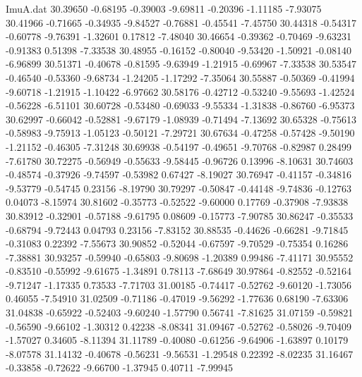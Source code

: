 \begin{filecontents}{ImuA.dat}
  30.39650   -0.68195   -0.39003   -9.69811   -0.20396   -1.11185   -7.93075
  30.41966   -0.71665   -0.34935   -9.84527   -0.76881   -0.45541   -7.45750
  30.44318   -0.54317   -0.60778   -9.76391   -1.32601    0.17812   -7.48040
  30.46654   -0.39362   -0.70469   -9.63231   -0.91383    0.51398   -7.33538
  30.48955   -0.16152   -0.80040   -9.53420   -1.50921   -0.08140   -6.96899
  30.51371   -0.40678   -0.81595   -9.63949   -1.21915   -0.69967   -7.33538
  30.53547   -0.46540   -0.53360   -9.68734   -1.24205   -1.17292   -7.35064
  30.55887   -0.50369   -0.41994   -9.60718   -1.21915   -1.10422   -6.97662
  30.58176   -0.42712   -0.53240   -9.55693   -1.42524   -0.56228   -6.51101
  30.60728   -0.53480   -0.69033   -9.55334   -1.31838   -0.86760   -6.95373
  30.62997   -0.66042   -0.52881   -9.67179   -1.08939   -0.71494   -7.13692
  30.65328   -0.75613   -0.58983   -9.75913   -1.05123   -0.50121   -7.29721
  30.67634   -0.47258   -0.57428   -9.50190   -1.21152   -0.46305   -7.31248
  30.69938   -0.54197   -0.49651   -9.70768   -0.82987    0.28499   -7.61780
  30.72275   -0.56949   -0.55633   -9.58445   -0.96726    0.13996   -8.10631
  30.74603   -0.48574   -0.37926   -9.74597   -0.53982    0.67427   -8.19027
  30.76947   -0.41157   -0.34816   -9.53779   -0.54745    0.23156   -8.19790
  30.79297   -0.50847   -0.44148   -9.74836   -0.12763    0.04073   -8.15974
  30.81602   -0.35773   -0.52522   -9.60000    0.17769   -0.37908   -7.93838
  30.83912   -0.32901   -0.57188   -9.61795    0.08609   -0.15773   -7.90785
  30.86247   -0.35533   -0.68794   -9.72443    0.04793    0.23156   -7.83152
  30.88535   -0.44626   -0.66281   -9.71845   -0.31083    0.22392   -7.55673
  30.90852   -0.52044   -0.67597   -9.70529   -0.75354    0.16286   -7.38881
  30.93257   -0.59940   -0.65803   -9.80698   -1.20389    0.99486   -7.41171
  30.95552   -0.83510   -0.55992   -9.61675   -1.34891    0.78113   -7.68649
  30.97864   -0.82552   -0.52164   -9.71247   -1.17335    0.73533   -7.71703
  31.00185   -0.74417   -0.52762   -9.60120   -1.73056    0.46055   -7.54910
  31.02509   -0.71186   -0.47019   -9.56292   -1.77636    0.68190   -7.63306
  31.04838   -0.65922   -0.52403   -9.60240   -1.57790    0.56741   -7.81625
  31.07159   -0.59821   -0.56590   -9.66102   -1.30312    0.42238   -8.08341
  31.09467   -0.52762   -0.58026   -9.70409   -1.57027    0.34605   -8.11394
  31.11789   -0.40080   -0.61256   -9.64906   -1.63897    0.10179   -8.07578
  31.14132   -0.40678   -0.56231   -9.56531   -1.29548    0.22392   -8.02235
  31.16467   -0.33858   -0.72622   -9.66700   -1.37945    0.40711   -7.99945

\end{filecontents}
